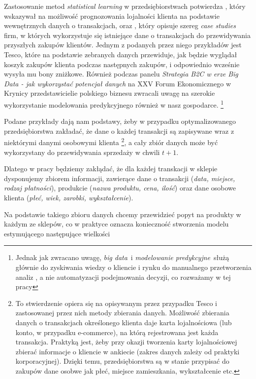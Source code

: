 \documentclass[polish, twoside, 12pt, a4paper]{article}
\theoremstyle{definition}
\theoremstyle{plain}
\theoremstyle{remark}
\begin{document}
Zastosowanie metod \textit{statistical learning} w przedsiębiorstwach potwierdza \cite{Buckinx2007}, który wskazywał na możliwość prognozowania lojalności klienta na podstawie wewnętrznych danych o transakcjach, oraz \cite{Davenport2011}, który opisuje szereg  \textit{case studies} firm, w których wykorzystuje się istniejące dane o transakcjach do przewidywania przyszłych zakupów klientów. Jednym z podanych przez niego przykładów jest Tesco, które na podstawie zebranych danych przewiduje, jak będzie wyglądał koszyk zakupów klienta podczas następnych zakupów, i odpowiednio wcześnie wysyła mu bony zniżkowe. Również podczas panelu \textit{Strategia B2C w erze Big Data - jak wykorzystać potencjał danych} na XXV Forum Ekonomicznego w Krynicy przedstawicielie polskiego biznesu zwracali uwagę na szerokie wykorzystanie modelowania predykcyjnego również w nasz gospodarce. \footnote{Jednak jak zwracano uwagę, \textit{big data}\ i \textit{modelowanie predykcyjne}\ służą głównie do zyskiwania wiedzy o kliencie i rynku do manualnego przetworzenia analiz , a nie automatyzacji podejmowania decyzji, co rozważamy w tej pracy}

Podane przykłady dają nam podstawy, żeby w przypadku optymalizowanego przedsiębiorstwa zakładać, że dane o każdej transakcji są zapisywane wraz z niektórymi danymi osobowymi klienta \footnote{To stwierdzenie opiera się na opisywanym przez \cite{Davenport2011} przypadku Tesco i zastosowanej przez nich metody zbierania danych. Możliwość zbierania danych o transakcjach określonego klienta daje karta lojalnościowa (lub konto, w przypadku e-commerce), na którą rejestrowana jest każda transakcja. Praktyką jest, żeby przy okazji tworzenia karty lojalnościowej zbierać informacje o kliencie w ankiecie (zakres danych zależy od praktyki korporacyjnej). Dzięki temu, przedsiębiorstwa są w stanie przypisać do zakupów dane osobwe jak płeć, miejsce zamieszkania, wykształcenie etc.}, a cały zbiór danych może być wykorzystany do przewidywania sprzedaży w chwili $t + 1$. 

Dlatego w pracy będziemy zakłądać, że dla każdej transkacji w sklepie dysponujemy zbiorem informacji, zawierące dane o transakcji (\textit{data, miejsce, rodzaj płatności}), produkcie (\textit{nazwa produktu, cena, ilość}) oraz dane osobowe klienta (\textit{płeć, wiek, zarobki, wykształcenie}).

Na podstawie takiego zbioru danych chcemy przewidzieć popyt na produkty w każdym ze sklepów, co w praktyce oznacza konieczność stworzenia modelu estymującego następujące wielkości
\end{document}
